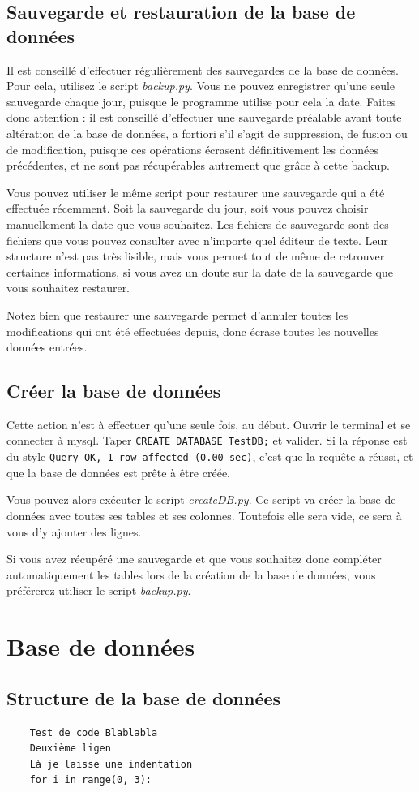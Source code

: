 \documentclass[12pt,a4paper]{article}
\begin{document}
\bigskip
\subsection{Sauvegarde et restauration de la base de données}
    
    Il est conseillé d'effectuer régulièrement des sauvegardes de la base de données.
    Pour cela, utilisez le script \emph{backup.py}. Vous ne pouvez enregistrer qu'une seule sauvegarde
    chaque jour, puisque le programme utilise pour cela la date. Faites donc attention : il est conseillé d'effectuer
    une sauvegarde préalable avant toute altération de la base de données, a fortiori s'il s'agit de suppression,
    de fusion ou de modification, puisque ces opérations écrasent définitivement les données précédentes, et ne sont
    pas récupérables autrement que grâce à cette backup.

    Vous pouvez utiliser le même script pour restaurer une sauvegarde qui a été effectuée récemment. Soit la sauvegarde
    du jour, soit vous pouvez choisir manuellement la date que vous souhaitez.
    Les fichiers de sauvegarde sont des fichiers que vous pouvez consulter avec n'importe quel éditeur de texte.
    Leur structure n'est pas très lisible, mais vous permet tout de même de retrouver certaines informations, si vous
    avez un doute sur la date de la sauvegarde que vous souhaitez restaurer.

    Notez bien que restaurer une sauvegarde permet d'annuler toutes les modifications qui ont été effectuées depuis,
    donc écrase toutes les nouvelles données entrées.


\bigskip
\subsection{Créer la base de données}

    Cette action n'est à effectuer qu'une seule fois, au début.
    Ouvrir le terminal %
    et se connecter à mysql.
    Taper \verb+CREATE DATABASE TestDB;+ et valider. Si la réponse est du
    style \verb+Query OK, 1 row affected (0.00 sec)+, c'est que la requête
    a réussi, et que la base de données est prête à être créée.
    
    Vous pouvez alors exécuter le script \emph{createDB.py}. Ce script va créer
    la base de données avec toutes ses tables et ses colonnes. Toutefois elle
    sera vide, ce sera à vous d'y ajouter des lignes.

    Si vous avez récupéré une sauvegarde et que vous souhaitez donc compléter
    automatiquement les tables lors de la création de la base de données, vous
    préférerez utiliser le script \emph{backup.py}.


\clearpage
\section{Base de données}

\bigskip
\subsection{Structure de la base de données}

\begin{verbatim}
    Test de code Blablabla
    Deuxième ligen
    Là je laisse une indentation
    for i in range(0, 3):
\end{verbatim}
\end{document}
